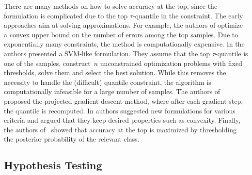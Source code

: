 There are many methods on how to solve accuracy at the top, since the formulation is complicated due to the top $\tau$-quantile in the constraint. The early approaches aim at solving approximations. For example, the authors of \cite{joachims2005svm} optimize a convex upper bound on the number of errors among the top samples. Due to exponentially many constraints, the method is computationally expensive. In \cite{boyd2012accuracy} the authors presented a SVM-like formulation. They assume that the top $\tau$-quantile is one of the samples, construct~$n$ unconstrained optimization problems with fixed thresholds, solve them and select the best solution. While this removes the necessity to handle the (difficult) quantile constraint, the algorithm is computationally infeasible for a large number of samples. The authors of~\cite{grill2016learning} proposed the projected gradient descent method, where after each gradient step, the quantile is recomputed. In \cite{eban2017scalable} authors suggested new formulations for various criteria and argued that they keep desired properties such as convexity. Finally, the authors of~\cite{tasche2018plug} showed that accuracy at the top is maximized by thresholding the posterior probability of the relevant class.

\subsection{Hypothesis Testing}

